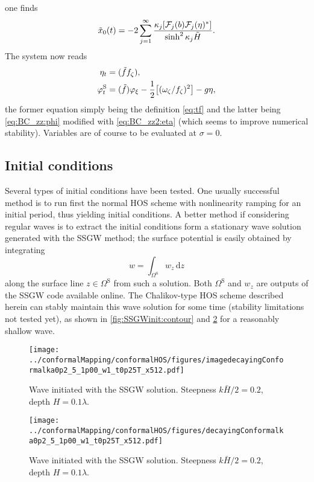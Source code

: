 \documentclass[a4paper,12pt]{article}
\newcommand{\mr}{\mathrm}
\newcommand{\mc}{\mathcal}
\renewcommand{\S}{^\mr{S}}
\renewcommand{\_}[1]{_\mr{#1}}
\let\Re\relax
\let\Im\relax
\DeclareMathOperator\Re{Re}
\DeclareMathOperator\Im{Im}
\newcommand{\w}{w}
\newcommand{\z}{z}
\newcommand{\zz}{\zeta}
\newcommand{\xx}{\xi}
\newcommand{\yy}{\sigma}
\newcommand{\kk}{\kappa}
\newcommand{\zmap}{f}
\newcommand{\ww}{\omega}
\renewcommand{\w}{w}
\newcommand{\Hzz}{\tilde H}
\newcommand{\hzz}{\eta}
\newcommand{\FF}{\mc F}
\newcommand{\tf}{\tilde \zmap}
\begin{document}
one finds
\begin{equation}
\tilde x_{0}(t) = -2\sum_{j=1}^\infty \frac{\kk_j \Im[\FF_j(b)\FF_j(\eta)^*]}{\sinh^2\kk_j\Hzz}.
\label{eq:tx0}
\end{equation}
The system now reads
\begin{subequations}
\begin{align}
\eta_t&= \Im(\tf \zmap_\zz), \\
\varphi\S_t &= \Re(\tf)\varphi_\xx  - \frac12\Re \big[(\ww_\zz/\zmap_\zz)^2\big]  - g \hzz,
\end{align}%
\label{eq:BC_zz2}%
\end{subequations}%
the former equation simply being the definition \eqref{eq:tf} and the latter being \eqref{eq:BC_zz:phi} modified with \eqref{eq:BC_zz2:eta} (which seems to improve numerical stability).
Variables are of course to be evaluated at $\yy=0$.


\subsection*{Initial conditions}
Several types of initial conditions have been tested. 
One usually successful method is to run first the normal HOS scheme with nonlinearity ramping for an initial period, thus yielding initial conditions.
A better method if considering regular waves is to extract the initial conditions form a stationary wave solution generated with the SSGW \citep{clamond2018accurate} method;
the surface potential is easily obtained by integrating
\[\w = \int_{\Omega\S}\! \w_\z \,\mr d z\] 
along the surface line $z\in\Omega\S$ from such a solution. 
Both $\Omega\S$ and  $\w_\z$ are outputs of the SSGW code available online. 
The Chalikov-type HOS scheme described herein can stably maintain this wave solution for some time (stability limitations not tested yet), as shown in \autoref{fig:SSGWinit:contour} and \ref{fig:SSGWinit:eta} for a reasonably shallow wave. 


\begin{figure}[h!ptb]%
\centering
\texttt{[image: ../conformalMapping/conformalHOS/figures/imagedecayingConformalka0p2\_M5\_h1p00\_Nw1\_dt0p25T\_nx512.pdf]}%
\caption{Wave initiated with the SSGW solution. Steepness $k\bar H/2=0.2$, depth $H=0.1\lambda$.}%
\label{fig:SSGWinit:contour}%
\end{figure}
\begin{figure}[h!ptb]%
\centering
\texttt{[image: ../conformalMapping/conformalHOS/figures/decayingConformalka0p2\_M5\_h1p00\_Nw1\_dt0p25T\_nx512.pdf]}%
\caption{Wave initiated with the SSGW solution. Steepness $k\bar H/2=0.2$, depth $H=0.1\lambda$.}%
\label{fig:SSGWinit:eta}%
\end{figure}
\end{document}

